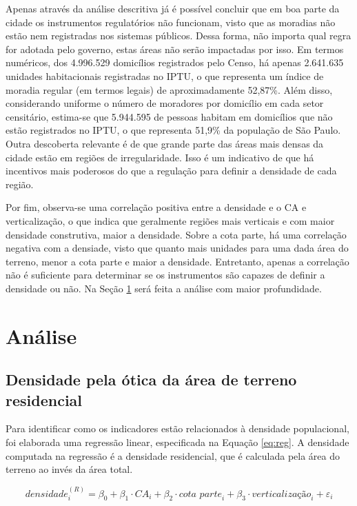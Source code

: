 Apenas através da análise descritiva já é possível concluir que em boa parte da cidade os instrumentos regulatórios não funcionam, visto que as moradias não estão nem registradas nos sistemas públicos. Dessa forma, não importa qual regra for adotada pelo governo, estas áreas não serão impactadas por isso. Em termos numéricos, dos 4.996.529 domicílios registrados pelo Censo, há apenas 2.641.635 unidades habitacionais registradas no IPTU, o que representa um índice de moradia regular (em termos legais) de aproximadamente 52,87\%. Além disso, considerando uniforme o número de moradores por domicílio em cada setor censitário, estima-se que 5.944.595 de pessoas habitam em domicílios que não estão registrados no IPTU, o que representa 51,9\% da população de São Paulo. Outra descoberta relevante é de que grande parte das áreas mais densas da cidade estão em regiões de irregularidade. Isso é um indicativo de que há incentivos mais poderosos do que a regulação para definir a densidade de cada região.

Por fim, observa-se uma correlação positiva entre a densidade e o CA e verticalização, o que indica que geralmente regiões mais verticais e com maior densidade construtiva, maior a densidade. Sobre a cota parte, há uma correlação negativa com a densiade, visto que quanto mais unidades para uma dada área do terreno, menor a cota parte e maior a densidade. Entretanto, apenas a correlação não é suficiente para determinar se os instrumentos são capazes de definir a densidade ou não. Na Seção \ref{sec:analise} será feita a análise com maior profundidade.


\chapter{Análise}
\label{sec:analise}

\section{Densidade pela ótica da área de terreno residencial}

Para identificar como os indicadores estão relacionados à densidade populacional, foi elaborada uma regressão linear, especificada na Equação \ref{eq:reg}. A densidade computada na regressão é a densidade residencial, que é calculada pela área do terreno ao invés da área total.

\begin{equation}
    \textit{densidade}_i^{(R)} = \beta_0 + \beta_1 \cdot \textit{CA}_i + \beta_2 \cdot\textit{cota parte}_i + \beta_3\cdot\textit{verticalização}_i + \varepsilon_i
    \label{eq:reg}
\end{equation}


